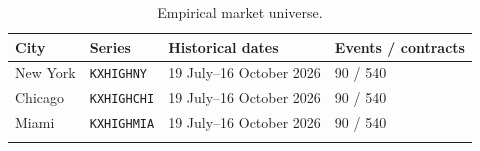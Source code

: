 \begin{table}[htbp]\centering
{\fontsize{10}{12}\selectfont\renewcommand{\arraystretch}{1.18}\setlength{\tabcolsep}{4pt}
\begin{tabularx}{\linewidth}{@{}L{25mm}L{31mm}L{64mm}X@{}}\toprule{}
\textbf{City} & \textbf{Series} & \textbf{Historical dates} & \textbf{Events / contracts} \\ \midrule
New York & \texttt{KXHIGHNY} & 19 July--16 October 2026 & 90 / 540 \\ \hline
Chicago & \texttt{KXHIGHCHI} & 19 July--16 October 2026 & 90 / 540 \\ \hline
Miami & \texttt{KXHIGHMIA} & 19 July--16 October 2026 & 90 / 540 \\ \hline
{}\bottomrule\end{tabularx}}
\caption[Empirical market universe]{Empirical market universe.}\label{tab:series}
\end{table}
